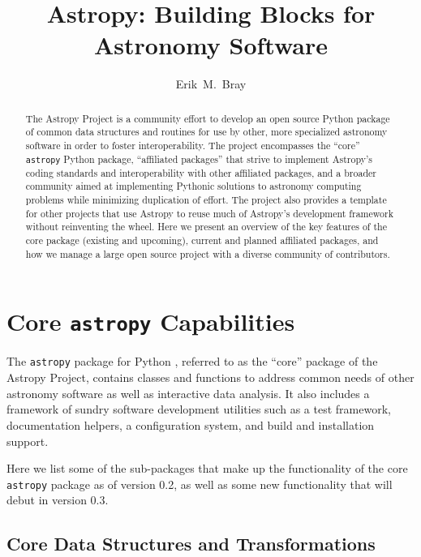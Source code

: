 \documentclass[11pt,twoside]{article}
\begin{document}
\title{Astropy: Building Blocks for Astronomy Software}

\author{Erik~M.~Bray
}

\begin{abstract}
The Astropy Project is a community effort to develop an open source Python
package of common data structures and routines for use by other, more
specialized astronomy software in order to foster interoperability.
The project encompasses the ``core'' \texttt{astropy} Python package,
``affiliated packages'' that strive to implement Astropy's coding standards and
interoperability with other affiliated packages, and a broader community aimed
at implementing Pythonic solutions to astronomy computing problems while
minimizing duplication of effort.  The project also provides a template for
other projects that use Astropy to reuse much of Astropy's development
framework without reinventing the wheel.
Here we present an overview of the key features of the core package (existing
and upcoming), current and planned affiliated packages, and how we manage a
large open source project with a diverse community of contributors.
\end{abstract}

\section{Core \texttt{astropy} Capabilities}

The \texttt{astropy} package for Python \citep{2013arXiv1307.6212T}, referred
to as the ``core'' package of the Astropy Project, contains classes and functions
to address common needs of other astronomy software as well as interactive data
analysis.  It also includes a framework of sundry software development
utilities such as a test framework, documentation helpers, a configuration
system, and build and installation support.

Here we list some of the sub-packages that make up the functionality of the
core \texttt{astropy} package as of version 0.2, as well as some new
functionality that will debut in version 0.3.

\subsection{Core Data Structures and Transformations}

\end{document}
